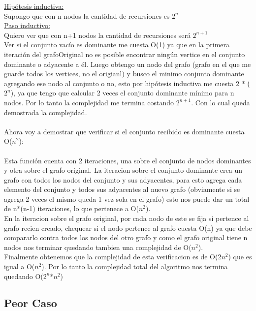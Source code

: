 \underline{Hipótesis inductiva:}\\

Supongo que con n nodos la cantidad de recursiones es $2^n$ \\

\underline{Paso inductivo:}\\

Quiero ver que con n+1 nodos la cantidad de recursiones será $2^{n+1}$\\

Ver si el conjunto vacío es dominante me cuesta O(1) ya que en la primera iteración del grafoOriginal no es posible encontrar ningún vertice en el conjunto dominante o adyacente a él. Luego obtengo un nodo del grafo (grafo en el que me guarde todos los vertices, no el origianl) y busco el minimo conjunto dominante agregando ese nodo al conjunto o no, esto por hipótesis inductiva me cuesta 2 * ($2^n$), ya que tengo que calcular 2 veces el conjunto dominante mínimo para n nodos. Por lo tanto la complejidad me termina costando  $2^{n+1}$. Con lo cual queda demostrada la complejidad.\\
\\
Ahora voy a demostrar que verificar si el conjunto recibido es dominante cuesta  O($n^2$):\\
\\
 Esta función cuenta con 2 iteraciones, una sobre el conjunto de nodos dominantes y otra sobre el grafo original. La iteracion sobre el conjunto dominante crea un grafo con todos los nodos del conjunto y sus adyacentes, para esto agrega cada elemento del conjunto y todos sus adyacentes al nuevo grafo (obviamente si se agrega 2 veces el mismo queda 1 vez sola en el grafo) esto nos puede dar un total de n*(n-1) iteraciones, lo que pertenece a O($n^2$).\\
En la iteracion sobre el grafo original, por cada nodo de este se fija si pertence al grafo recien creado, chequear si el nodo pertence al grafo cuesta O(n) ya que debe compararlo contra todos los nodos del otro grafo y como el grafo original tiene n nodos nos terminar quedando tambien una complejidad de O($n^2$).\\
Finalmente obtenemos que la complejidad de esta verificacion es de O(2$n^2$) que es igual a O($n^2$). Por lo tanto la complejidad total del algoritmo nos termina quedando O($2^n$*$n^2$)\\


\subsection{Peor Caso}


